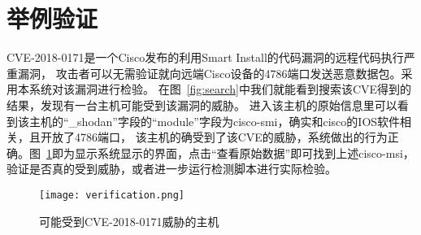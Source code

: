 \section{举例验证}
\label{sec:verification}

CVE-2018-0171是一个Cisco发布的利用Smart Install的代码漏洞的远程代码执行严重漏洞，
攻击者可以无需验证就向远端Cisco设备的4786端口发送恶意数据包。采用本系统对该漏洞进行检验。
在图~\ref{fig:search}中我们就能看到搜索该CVE得到的结果，发现有一台主机可能受到该漏洞的威胁。
进入该主机的原始信息里可以看到该主机的“\_shodan”字段的“module”字段为cisco-smi，确实和cisco的IOS软件相关，且开放了4786端口，
该主机的确受到了该CVE的威胁，系统做出的行为正确。图~\ref{fig:verification}即为显示系统显示的界面，点击“查看原始数据”即可找到上述cisco-msi，
验证是否真的受到威胁，或者进一步运行检测脚本进行实际检验。

\begin{figure}[H]
    \centering
    \texttt{[image: verification.png]}
    \caption{可能受到CVE-2018-0171威胁的主机}
    \label{fig:verification}
\end{figure}
